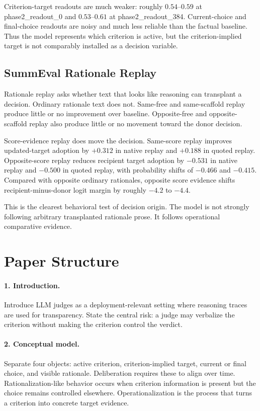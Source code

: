 \documentclass[11pt]{article}
\begin{document}
Criterion-target readouts are much weaker: roughly $0.54$--$0.59$ at
phase2\_readout\_0 and $0.53$--$0.61$ at phase2\_readout\_384. Current-choice
and final-choice readouts are noisy and much less reliable than the factual
baseline. Thus the model represents which criterion is active, but the
criterion-implied target is not comparably installed as a decision variable.

\subsection{SummEval Rationale Replay}

Rationale replay asks whether text that looks like reasoning can transplant a
decision. Ordinary rationale text does not. Same-free and same-scaffold replay
produce little or no improvement over baseline. Opposite-free and
opposite-scaffold replay also produce little or no movement toward the donor
decision.

Score-evidence replay does move the decision. Same-score replay improves
updated-target adoption by $+0.312$ in native replay and $+0.188$ in quoted
replay. Opposite-score replay reduces recipient target adoption by $-0.531$ in
native replay and $-0.500$ in quoted replay, with probability shifts of
$-0.466$ and $-0.415$. Compared with opposite ordinary rationales, opposite
score evidence shifts recipient-minus-donor logit margin by roughly
$-4.2$ to $-4.4$.

This is the clearest behavioral test of decision origin. The model is not
strongly following arbitrary transplanted rationale prose. It follows
operational comparative evidence.

\section{Paper Structure}

\paragraph{1. Introduction.}
Introduce LLM judges as a deployment-relevant setting where reasoning traces
are used for transparency. State the central risk: a judge may verbalize the
criterion without making the criterion control the verdict.

\paragraph{2. Conceptual model.}
Separate four objects: active criterion, criterion-implied target, current or
final choice, and visible rationale. Deliberation requires these to align over
time. Rationalization-like behavior occurs when criterion information is
present but the choice remains controlled elsewhere. Operationalization is
the process that turns a criterion into concrete target evidence.
\end{document}
